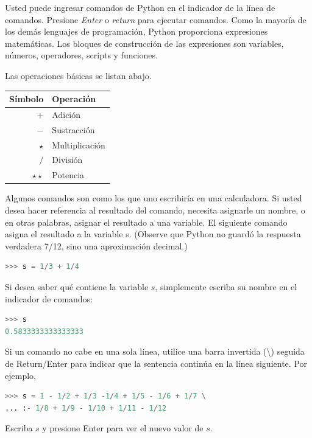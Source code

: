 Usted puede ingresar comandos de Python en el indicador de la línea de comandos. Presione \textit{Enter} o \textit{return} para ejecutar comandos. Como la mayoría de los demás lenguajes de programación, Python proporciona expresiones matemáticas. Los bloques de construcción de las expresiones son variables, números, operadores, scripts y funciones.

Las operaciones básicas se listan abajo. \vs

\begin{tabular}{r|l}
\hline
Símbolo 		& Operación \\
\hline
$+$       	&    Adición \\
$-$       	&    Sustracción \\
$\star$   	&    Multiplicación \\
$/$       	&    División \\
$\star\star$&      Potencia \\
\hline
\end{tabular}

\vs

Algunos comandos son como los que uno escribiría en una calculadora. Si usted desea hacer referencia al resultado del comando, necesita asignarle un nombre, o en otras palabras, asignar el resultado a una variable. El siguiente comando asigna el resultado a la variable s. (Observe que Python no guardó la respuesta verdadera 7/12, sino una aproximación decimal.)

\begin{lstlisting}[language=Python]
>>> s = 1/3 + 1/4
\end{lstlisting}

Si desea saber qué contiene la variable $s$, simplemente escriba su nombre en el indicador de comandos:

\begin{lstlisting}[language=Python]
>>> s
0.5833333333333333
\end{lstlisting}

Si un comando no cabe en una sola línea, utilice una barra invertida (\textbackslash) seguida de Return/Enter para indicar que la sentencia continúa en la línea siguiente. Por ejemplo,

\begin{lstlisting}[language=Python]
>>> s = 1 - 1/2 + 1/3 -1/4 + 1/5 - 1/6 + 1/7 \
... :- 1/8 + 1/9 - 1/10 + 1/11 - 1/12
\end{lstlisting}

Escriba $s$ y presione Enter para ver el nuevo valor de $s$.

